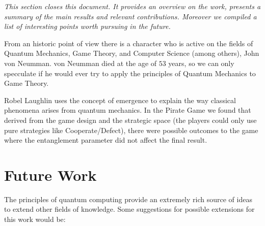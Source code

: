 \label{cap:conclusions}

\textit{This section closes this document. It provides an overview on the work, presents a summary of the main results and relevant contributions. Moreover we compiled a list of interesting points worth pursuing in the future.}

From an historic point of view there is a character who is active on the fields of Quantum Mechanics, Game Theory, and Computer Science (among others), John von Neumman. von Neumman died at the age of $53$ years, so we can only specculate if he would ever try to apply the principles of Quantum Mechanics to Game Theory. 


Robel Laughlin uses the concept of emergence to explain the way classical phenomena arises from quantum mechanics\cite{Laughlin2005}. In the Pirate Game we found that derived from the game design and the strategic space (the players could only use pure strategies like Cooperate/Defect), there were possible outcomes to the game where the entanglement parameter did not affect the final result.

\section{Future Work}
\label{sec:5FutureWork}

The principles of quantum computing provide an extremely rich source of ideas to extend other fields of knowledge.
Some suggestions for possible extensions for this work would be:

